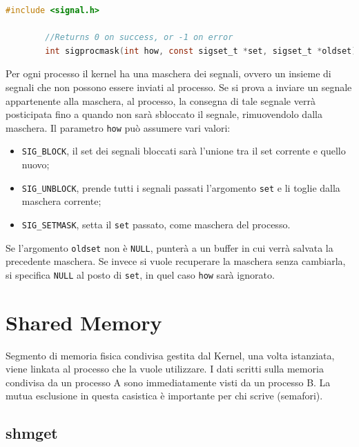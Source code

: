 \documentclass[a4paper, 12pt]{book}
\begin{document}
    \begin{lstlisting}[language=C]
        #include <signal.h>

        //Returns 0 on success, or -1 on error  
        int sigprocmask(int how, const sigset_t *set, sigset_t *oldset);
    \end{lstlisting}
    Per ogni processo il kernel ha una maschera dei segnali, 
    ovvero un insieme di segnali che non possono essere 
    inviati al processo. Se si prova a inviare un segnale 
    appartenente alla maschera, al processo, la consegna 
    di tale segnale verrà posticipata fino a quando 
    non sarà sbloccato il segnale, rimuovendolo dalla maschera.
    Il parametro \verb|how| può assumere vari valori:
    \begin{itemize}
        \item \verb|SIG_BLOCK|, il set dei segnali bloccati 
        sarà l'unione tra il set corrente e quello nuovo;
        \item \verb|SIG_UNBLOCK|, prende tutti i segnali passati
        l'argomento \verb|set| e li toglie dalla maschera corrente;
        \item \verb|SIG_SETMASK|, setta il \verb|set| passato, 
        come maschera del processo.
    \end{itemize}
    Se l'argomento \verb|oldset| non è \verb|NULL|, punterà 
    a un buffer in cui verrà salvata la precedente maschera.
    Se invece si vuole recuperare la maschera senza cambiarla, 
    si specifica \verb|NULL| al posto di \verb|set|, in quel 
    caso \verb|how| sarà ignorato.

    \section{Shared Memory}

    Segmento di memoria fisica condivisa gestita dal 
    Kernel, una volta istanziata, viene linkata al 
    processo che la vuole utilizzare. I dati scritti 
    sulla memoria condivisa da un processo A sono 
    immediatamente visti da un processo B. La mutua esclusione 
    in questa casistica è importante per chi scrive (semafori).
    
    \subsection{shmget}
\end{document}
